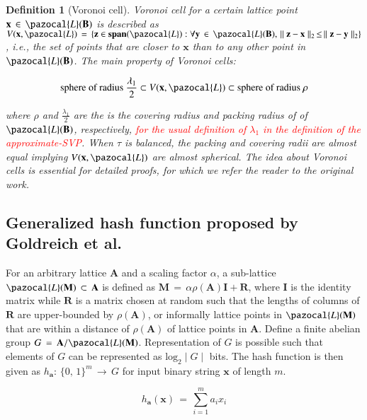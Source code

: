 \documentclass[10pt]{elsarticle}
\newtheorem{definition}{Definition}
\begin{document}
\begin{definition}[Voronoi cell]
\normalfont Voronoi cell for a certain lattice point
$\mathbf{x}\,\in\, \pazocal{L}(\mathbf{B})$ is described as
$V(\mathbf{x},
\pazocal{L})\,=\,\{\mathbf{z}\in\mbox{\textbf{span}}(\pazocal{L}):\forall
\mathbf{y}\,\in\,\pazocal{L}(\mathbf{B}),\,\parallel \mathbf{z} -
\mathbf{x}\parallel_{2} \,\leq\,\parallel \mathbf{z} - \mathbf{y}
\parallel_{2} \}$, i.e., the set of points that are closer
to $\mathbf{x}$ than to any other point in
$\pazocal{L}(\mathbf{B})$. The main property of Voronoi cells:

$$\mbox{sphere~of~radius}~\frac{\lambda_{1}}{2}\subset V(\mathbf{x},\pazocal{L})\subset\mbox{sphere~of~radius}~\rho$$

where $\rho$ and $\frac{\lambda_{1}}{2}$ are the is the covering
radius and packing radius of of $\pazocal{L}(\mathbf{B})$,
respectively, \textcolor{red}{for the usual definition of
$\lambda_{1}$ in the definition of the \textit{approximate}-SVP}.
When $\tau$ is balanced, the packing and covering radii are almost
equal implying $V(\mathbf{x},\pazocal{L})$ are \textit{almost}
spherical. The idea about Voronoi cells is essential for detailed
proofs, for which we refer the reader to the original work.
\end{definition}

\subsection{Generalized hash function proposed by Goldreich et al. \cite{CRHF_Goldreich1996}}
For an arbitrary lattice $\mathbf{A}$ and a scaling factor $\alpha$,
a sub-lattice $\pazocal{L}(\mathbf{M})\, \subset \, \mathbf{A}$ is
defined as $\mathbf{M} \, = \, \alpha \rho(\mathbf{A})\textbf{I} +
\textbf{R}$, where $\mathbf{I}$ is the identity matrix while
$\mathbf{R}$ is a matrix chosen at random such that the lengths of
columns of $\textbf{R}$ are upper-bounded by $\rho(\mathbf{A})$, or
informally lattice points in $\pazocal{L}(\mathbf{M})$ that are
within a distance of $\rho(\mathbf{A})$ of lattice points in
$\mathbf{A}$. Define a finite abelian group $G \, = \,
\mathbf{A}/\pazocal{L}(\mathbf{M})$. Representation of $G$ is
possible such that elements of $G$ can be represented as
$\mbox{log}_{2}\mid G\mid$ bits. The hash function is then given as
$h_{\mathbf{a}}:\, \{0,\,1\}^{m} \, \rightarrow \, G$ for input
binary string $\mathbf{x}$ of length $m$.

$$h_{\mathbf{a}}(\mathbf{x}) \, = \, \sum_{i=1}^{m}a_{i}x_{i}$$
\end{document}
